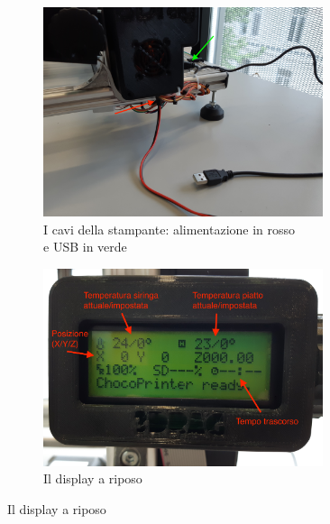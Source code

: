 \documentclass[12pt]{article}
\begin{document}
	\begin{figure}[H]
        \begin{subfigure}{0.5\textwidth}
                \includegraphics[width=0.9\textwidth]{img/power.jpg}
                \caption*{I cavi della stampante: alimentazione in rosso\\ e USB in verde}
        \end{subfigure}
        \begin{subfigure}{0.5\textwidth}
                \includegraphics[width=0.9\textwidth]{img/display.jpg}
                \caption*{Il display a riposo}
         \end{subfigure}
	\end{figure}
	
\end{document}
